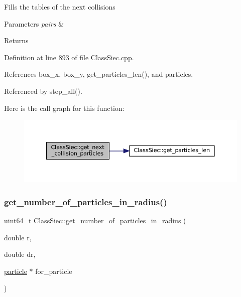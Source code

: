 Fills the tables of the next collisions 
\begin{DoxyParams}{Parameters}
{\em pairs} & \\
\hline
\end{DoxyParams}
\begin{DoxyReturn}{Returns}

\end{DoxyReturn}


Definition at line 893 of file Class\+Siec.\+cpp.



References box\+\_\+x, box\+\_\+y, get\+\_\+particles\+\_\+len(), and particles.



Referenced by step\+\_\+all().

Here is the call graph for this function\+:
\nopagebreak
\begin{figure}[H]
\begin{center}
\leavevmode
\includegraphics[width=350pt]{classClassSiec_a654072dec38aee93903bdce321890a80_cgraph}
\end{center}
\end{figure}
\mbox{\label{classClassSiec_ac5f8e08337a1ef96531495a6aee8bfb9}} 
\subsubsection{\texorpdfstring{get\+\_\+number\+\_\+of\+\_\+particles\+\_\+in\+\_\+radius()}{get\_number\_of\_particles\_in\_radius()}\hspace{0.1cm}{\footnotesize\ttfamily [1/2]}}
{\footnotesize\ttfamily uint64\+\_\+t Class\+Siec\+::get\+\_\+number\+\_\+of\+\_\+particles\+\_\+in\+\_\+radius (\begin{DoxyParamCaption}\item[{double}]{r,  }\item[{double}]{dr,  }\item[{\mbox{\hyperlink{structparticle}{particle}} $\ast$}]{for\+\_\+particle }\end{DoxyParamCaption})}

